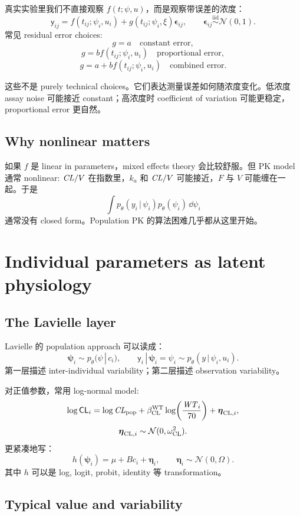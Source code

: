 \documentclass[a4paper]{article}
\newcommand{\rv}[1]{\mathsf{#1}}
\newcommand{\rpsi}{\boldsymbol{\psi}}
\newcommand{\reta}{\boldsymbol{\eta}}
\newcommand{\repsilon}{\boldsymbol{\epsilon}}
\newcommand{\given}{\,|\,}
\newcommand{\Normal}{\mathcal{N}}
\newcommand{\iid}{\overset{\mathrm{iid}}{\sim}}
\newcommand{\pop}{\mathrm{pop}}
\begin{document}
真实实验里我们不直接观察 \(f(t;\psi,u)\)，而是观察带误差的浓度：
\[
  \rv{y}_{ij}
  =
  f(t_{ij};\psi_i,u_i)
  +
  g(t_{ij};\psi_i,\xi)\repsilon_{ij},
  \qquad
  \repsilon_{ij}\iid \Normal(0,1).
\]
常见 residual error choices:
\[
  g = a \quad \text{constant error},
\]
\[
  g = b f(t_{ij};\psi_i,u_i) \quad \text{proportional error},
\]
\[
  g = a + b f(t_{ij};\psi_i,u_i) \quad \text{combined error}.
\]

这些不是 purely technical choices。它们表达测量误差如何随浓度变化。低浓度 assay noise 可能接近 constant；高浓度时 coefficient of variation 可能更稳定，proportional error 更自然。

\subsection{Why nonlinear matters}

如果 \(f\) 是 linear in parameters，mixed effects theory 会比较舒服。但 PK model 通常 nonlinear: \(\pksym{CL}/V\) 在指数里，\(k_a\) 和 \(\pksym{CL}/V\) 可能接近，\(F\) 与 \(V\) 可能缠在一起。于是
\[
  \int p_\theta(y_i\given \psi_i)p_\theta(\psi_i)\,\dd\psi_i
\]
通常没有 closed form。Population PK 的算法困难几乎都从这里开始。

\section{Individual parameters as latent physiology}

\subsection{The Lavielle layer}

Lavielle 的 population approach 可以读成：
\[
  \rpsi_i \sim p_\theta(\psi\given c_i),
  \qquad
  \rv{y}_i\given \rpsi_i=\psi_i \sim p_\theta(y\given \psi_i,u_i).
\]
第一层描述 inter-individual variability；第二层描述 observation variability。

对正值参数，常用 log-normal model:
\[
  \log \rv{CL}_i
  =
  \log \pksym{CL}_{\pop} + \beta_{\pklab{CL}}^{\pklab{WT}}\log\!\left(\frac{\pksym{WT}_i}{70}\right)
  +
  \reta_{\pklab{CL},i},
\]
\[
  \reta_{\pklab{CL},i}\sim \Normal(0,\omega_{\pklab{CL}}^2).
\]
更紧凑地写：
\[
  h(\rpsi_i)
  =
  \mu + B c_i + \reta_i,
  \qquad
  \reta_i\sim \Normal(0,\Omega).
\]
其中 \(h\) 可以是 log, logit, probit, identity 等 transformation。

\subsection{Typical value and variability}
\end{document}
